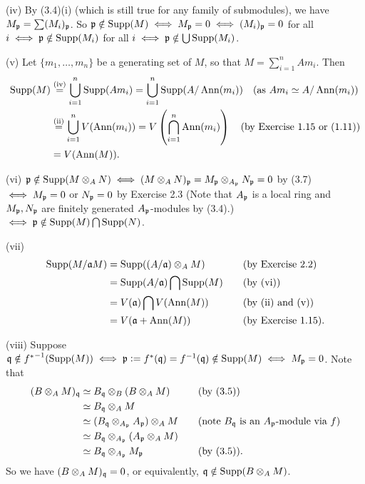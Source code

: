 \documentclass[../A&M.tex]{subfiles}
\begin{document}
(iv) By (3.4)(i) (which is still true for any family of submodules), we have $M_{\mathfrak{p}} = \sum (M_i)_{\mathfrak{p}}$. So $\mathfrak{p} \notin \operatorname{Supp}(M) \iff M_{\mathfrak{p}} = 0 \iff (M_i)_{\mathfrak{p}} = 0$ for all $i \iff \mathfrak{p} \notin \operatorname{Supp}(M_i)$ for all $i \iff \mathfrak{p} \notin \bigcup \operatorname{Supp}(M_i)$.

(v) Let $\{m_1,\ldots,m_n\}$ be a generating set of $M$, so that $M = \sum_{i=1}^n Am_i$. Then
\begin{align*}
\operatorname{Supp}(M)
&\overset{\text{(iv)}}{=} \bigcup_{i=1}^n \operatorname{Supp}(Am_i) = \bigcup_{i=1}^n \operatorname{Supp}(A/\operatorname{Ann}(m_i))  \quad \text{(as } Am_i \simeq A/\operatorname{Ann}(m_i) \text{)} \\ 
&\overset{\text{(ii)}}{=} \bigcup_{i=1}^n V(\operatorname{Ann}(m_i)) 
=V\left(\bigcap_{i=1}^n \operatorname{Ann}(m_i) \right) \quad \text{(by Exercise 1.15 or (1.11))} \\ 
&= V(\operatorname{Ann}(M)).
\end{align*}

(vi) $\mathfrak{p} \notin \operatorname{Supp}(M\otimes_A N) \iff (M\otimes_A N)_{\mathfrak{p}} = M_{\mathfrak{p}} \otimes_{A_{\mathfrak{p}}} N_{\mathfrak{p}} = 0$ by (3.7) $\iff M_{\mathfrak{p}} = 0$ or $N_{\mathfrak{p}} = 0$ by Exercise 2.3 (Note that $A_{\mathfrak{p}}$ is a local ring and $M_{\mathfrak{p}},N_{\mathfrak{p}}$ are finitely generated $A_{\mathfrak{p}}$-modules by (3.4).) $\iff \mathfrak{p} \notin \operatorname{Supp}(M) \bigcap \operatorname{Supp}(N)$.

(vii)
\begin{alignat*}{2}
\operatorname{Supp}(M/\mathfrak{a} M)
&= \operatorname{Supp}((A/\mathfrak{a}) \otimes_A M) \quad &&\text{(by Exercise 2.2)} \\ 
&= \operatorname{Supp}(A/\mathfrak{a}) \bigcap \operatorname{Supp}(M)  \quad &&\text{(by (vi))}  \\
&= V(\mathfrak{a}) \bigcap V(\operatorname{Ann}(M))  \quad &&\text{(by (ii) and (v))} \\
&= V(\mathfrak{a} + \operatorname{Ann}(M))  \quad &&\text{(by Exercise 1.15)}.
\end{alignat*}

(viii) Suppose $\mathfrak{q} \notin {f^*}^{-1}(\operatorname{Supp}(M)) \iff \mathfrak{p}:=f^*(\mathfrak{q})=f^{-1}(\mathfrak{q}) \notin \operatorname{Supp}(M) \iff M_{\mathfrak{p}}=0$. Note that
\begin{alignat*}{2}
(B \otimes_A M)_{\mathfrak{q}}
&\simeq B_{\mathfrak{q}} \otimes_B (B \otimes_A M)    &&\quad \text{(by (3.5))}  \\
&\simeq B_{\mathfrak{q}} \otimes_A M    \\
&\simeq (B_{\mathfrak{q}} \otimes_{A_{\mathfrak{p}}} A_{\mathfrak{p}}) \otimes_A M  &&\quad \text{(note $B_{\mathfrak{q}}$ is an $A_{\mathfrak{p}}$-module via $f$)}  \\
&\simeq B_{\mathfrak{q}} \otimes_{A_{\mathfrak{p}}} (A_{\mathfrak{p}} \otimes_A M)   \\
&\simeq B_{\mathfrak{q}} \otimes_{A_{\mathfrak{p}}} M_{\mathfrak{p}}  &&\quad \text{(by (3.5))}.
\end{alignat*}
So we have $(B \otimes_A M)_{\mathfrak{q}}=0$, or equivalently, $\mathfrak{q} \notin \operatorname{Supp}(B \otimes_A M)$.
\end{document}
